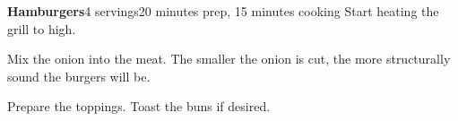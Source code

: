 \documentclass[../Cookbook.tex]{subfiles}
\begin{document}
\begin{recipe}{\textbf{Hamburgers}}{4 servings}{20 minutes prep, 15 minutes cooking}
  Start heating the grill to high.

  Mix the onion into the meat. The smaller the onion is cut, the more structurally sound the burgers will be.

  Prepare the toppings. Toast the buns if desired.
\end{recipe}
\end{document}

